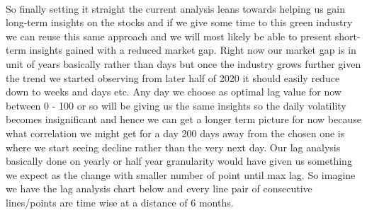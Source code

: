 \documentclass[sigconf, nonacm]{acmart}
\begin{document}
\\So finally setting it straight the current analysis leans towards helping us gain long-term insights on the stocks and if we give some time to this green industry we can reuse this same approach and we will most likely be able to present short-term insights gained with a reduced market gap. Right now our market gap is in unit of years basically rather than days but once the industry grows further given the trend we started observing from later half of 2020 it should easily reduce down to weeks and days etc. Any day we choose as optimal lag value for now between 0 - 100 or so will be giving us the same insights so the daily volatility becomes insignificant and hence we can get a longer term picture for now because what correlation we might get for a day 200 days away from the chosen one is where we start seeing decline rather than the very next day. Our lag analysis basically done on yearly or half year granularity would have given us something we expect as the change with smaller number of point until max lag. So imagine we have the lag analysis chart below and every line pair of consecutive lines/points are time wise at a distance of 6 months.
\end{document}
